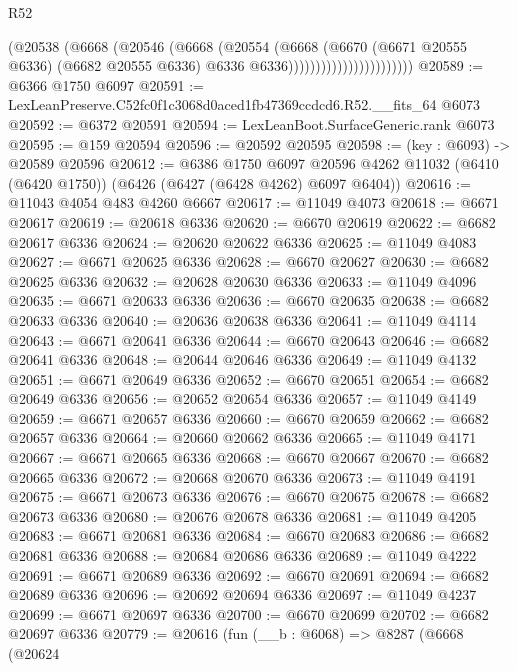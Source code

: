 \begin{lexlean}{R52}
\begin{coremodule}
                                    (@20538
                                      (@6668
                                        (@20546
                                          (@6668
                                            (@20554
                                              (@6668
                                                (@6670
                                                  (@6671 @20555 @6336)
                                                  (@6682 @20555 @6336)
                                                  @6336
                                                  @6336)))))))))))))))))))))))
@20589 := @6366 @1750 @6097
@20591 := LexLeanPreserve.C52fc0f1c3068d0aced1fb47369ccdcd6.R52.__fits_64 @6073
@20592 := @6372 @20591
@20594 := LexLeanBoot.SurfaceGeneric.rank @6073
@20595 := @159 @20594
@20596 := @20592 @20595
@20598 := (key : @6093) -> @20589 @20596
@20612 := @6386
    @1750
    @6097
    @20596
    @4262
    @11032
    (@6410 (@6420 @1750))
    (@6426 (@6427 (@6428 @4262) @6097 @6404))
@20616 := @11043 @4054 @483 @4260 @6667
@20617 := @11049 @4073
@20618 := @6671 @20617
@20619 := @20618 @6336
@20620 := @6670 @20619
@20622 := @6682 @20617 @6336
@20624 := @20620 @20622 @6336
@20625 := @11049 @4083
@20627 := @6671 @20625 @6336
@20628 := @6670 @20627
@20630 := @6682 @20625 @6336
@20632 := @20628 @20630 @6336
@20633 := @11049 @4096
@20635 := @6671 @20633 @6336
@20636 := @6670 @20635
@20638 := @6682 @20633 @6336
@20640 := @20636 @20638 @6336
@20641 := @11049 @4114
@20643 := @6671 @20641 @6336
@20644 := @6670 @20643
@20646 := @6682 @20641 @6336
@20648 := @20644 @20646 @6336
@20649 := @11049 @4132
@20651 := @6671 @20649 @6336
@20652 := @6670 @20651
@20654 := @6682 @20649 @6336
@20656 := @20652 @20654 @6336
@20657 := @11049 @4149
@20659 := @6671 @20657 @6336
@20660 := @6670 @20659
@20662 := @6682 @20657 @6336
@20664 := @20660 @20662 @6336
@20665 := @11049 @4171
@20667 := @6671 @20665 @6336
@20668 := @6670 @20667
@20670 := @6682 @20665 @6336
@20672 := @20668 @20670 @6336
@20673 := @11049 @4191
@20675 := @6671 @20673 @6336
@20676 := @6670 @20675
@20678 := @6682 @20673 @6336
@20680 := @20676 @20678 @6336
@20681 := @11049 @4205
@20683 := @6671 @20681 @6336
@20684 := @6670 @20683
@20686 := @6682 @20681 @6336
@20688 := @20684 @20686 @6336
@20689 := @11049 @4222
@20691 := @6671 @20689 @6336
@20692 := @6670 @20691
@20694 := @6682 @20689 @6336
@20696 := @20692 @20694 @6336
@20697 := @11049 @4237
@20699 := @6671 @20697 @6336
@20700 := @6670 @20699
@20702 := @6682 @20697 @6336
@20779 := @20616
    (fun (__b : @6068) =>
    @8287
      (@6668
        (@20624

\end{coremodule}
\end{lexlean}
